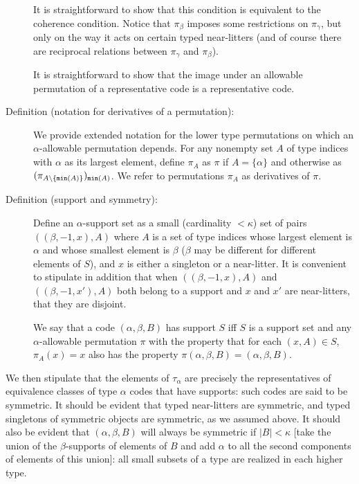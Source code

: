 \begin{description}
It is straightforward to show that this condition is equivalent to the coherence condition.  Notice that $\pi_\beta$ imposes some restrictions on $\pi_\gamma$, but only on the way it acts on certain typed near-litters (and of course there are reciprocal relations between $\pi_{\gamma}$ and $\pi_\beta$).

It is straightforward to show that the image under an allowable permutation of a representative code is a representative code.

\item[Definition (notation for derivatives of a permutation):] We provide extended notation for the lower type permutations on which an $\alpha$-allowable permutation depends.
For any nonempty set $A$ of type indices with $\alpha$ as its largest element, define $\pi_A$ as $\pi$ if $A = \{\alpha\}$
and otherwise as $(\pi_{A \setminus \{{\tt min}(A)\}})_{{\tt min}(A)}$.  We refer to permutations $\pi_A$ as derivatives of $\pi$.

\item[Definition (support and symmetry):]  Define an $\alpha$-support set as a small (cardinality $<\kappa$) set of pairs $((\beta,-1,x),A)$ where $A$ is a set of type indices whose largest element
is $\alpha$ and whose smallest element is $\beta$ ($\beta$ may be different for different elements of $S$), and $x$ is either a singleton or a near-litter.
It is convenient to stipulate in addition that when $((\beta,-1,x),A)$ and $((\beta,-1,x'),A)$ both belong to a support and $x$ and $x'$ are near-litters, that they are disjoint.

We say that a code $(\alpha,\beta,B)$ has support $S$ iff $S$ is a support set and any $\alpha$-allowable permutation $\pi$ with the property
that for each $(x,A) \in S$, $\pi_A(x)=x$ also has the property $\pi(\alpha,\beta,B)=(\alpha,\beta,B)$.

\end{description}

We then stipulate that the elements of $\tau_\alpha$  are precisely the representatives of equivalence classes of type $\alpha$ codes that have supports:  such codes are said to be symmetric.  It should be evident that typed near-litters are symmetric, and typed singletons of symmetric objects are symmetric, as we assumed above.   It should also be evident that $(\alpha,\beta,B)$ will always be symmetric if $|B|<\kappa$ [take the union of the $\beta$-supports of elements of $B$ and add $\alpha$ to all the second components of elements of this union]:  all small subsets of a type are realized in each higher type.

